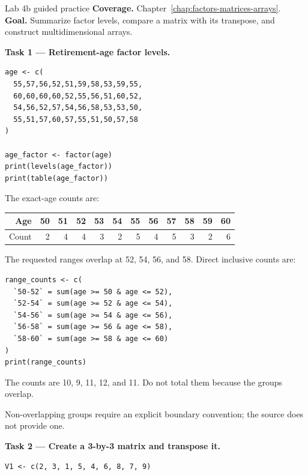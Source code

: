 
\begin{labproject}{Lab 4b guided practice}
\textbf{Coverage.} Chapter~\ref{chap:factors-matrices-arrays}.\\
\textbf{Goal.} Summarize factor levels, compare a matrix with its transpose, and construct multidimensional arrays.

\textbf{Task 1 --- Retirement-age factor levels.}

\begin{lstlisting}[style=dsr]
age <- c(
  55,57,56,52,51,59,58,53,59,55,
  60,60,60,60,52,55,56,51,60,52,
  54,56,52,57,54,56,58,53,53,50,
  55,51,57,60,57,55,51,50,57,58
)

age_factor <- factor(age)
print(levels(age_factor))
print(table(age_factor))
\end{lstlisting}

The exact-age counts are:

\begin{dstable}
\begin{tabular}{@{}rrrrrrrrrrrr@{}}
\toprule
Age & 50 & 51 & 52 & 53 & 54 & 55 & 56 & 57 & 58 & 59 & 60 \\
\midrule
Count & 2 & 4 & 4 & 3 & 2 & 5 & 4 & 5 & 3 & 2 & 6 \\
\bottomrule
\end{tabular}
\end{dstable}

The requested ranges overlap at 52, 54, 56, and 58. Direct inclusive counts are:

\begin{lstlisting}[style=dsr]
range_counts <- c(
  `50-52` = sum(age >= 50 & age <= 52),
  `52-54` = sum(age >= 52 & age <= 54),
  `54-56` = sum(age >= 54 & age <= 56),
  `56-58` = sum(age >= 56 & age <= 58),
  `58-60` = sum(age >= 58 & age <= 60)
)
print(range_counts)
\end{lstlisting}

The counts are 10, 9, 11, 12, and 11. Do not total them because the groups overlap.

\begin{pitfall}
Non-overlapping groups require an explicit boundary convention; the source does not provide one.
\end{pitfall}

\textbf{Task 2 --- Create a 3-by-3 matrix and transpose it.}

\begin{lstlisting}[style=dsr]
V1 <- c(2, 3, 1, 5, 4, 6, 8, 7, 9)


\end{lstlisting}
\end{labproject}
